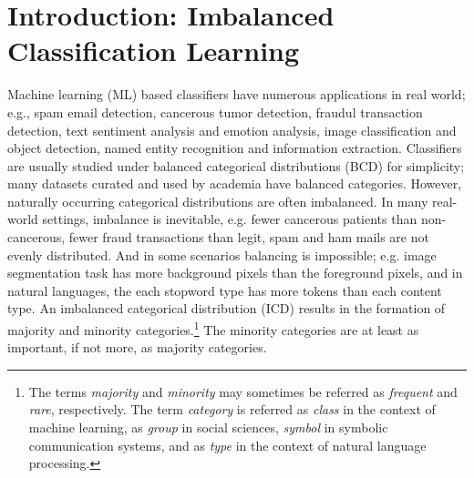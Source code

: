 
\chapter{Introduction: Imbalanced Classification Learning}


Machine learning (ML) based classifiers have numerous applications in real world; e.g., spam email detection, cancerous tumor detection, fraudul transaction detection, text sentiment analysis and emotion analysis, image classification and object detection, named entity recognition and information extraction.
Classifiers are usually studied under balanced categorical distributions (BCD) for simplicity; many datasets curated and used by academia have balanced categories. %
However, naturally occurring categorical distributions are often imbalanced. 
In many real-world settings, imbalance is inevitable, e.g. fewer cancerous patients than non-cancerous, fewer fraud transactions than legit, spam and ham mails are not evenly distributed.
And in some scenarios balancing is impossible; e.g. image segmentation task has more background pixels than the foreground pixels, and in natural languages, the each stopword type has more tokens than each content type.
An imbalanced categorical distribution (ICD) results in the formation of majority and minority categories.\footnote{
The terms \textit{majority} and \textit{minority} may sometimes be referred as \textit{frequent} and \textit{rare}, respectively. The term \textit{category} is referred as \textit{class} in the context of machine learning, as \textit{group} in social sciences, \textit{symbol} in symbolic communication systems, and as \textit{type} in the context of natural language processing.} 
The minority categories are at least as important, if not more, as majority categories. 

